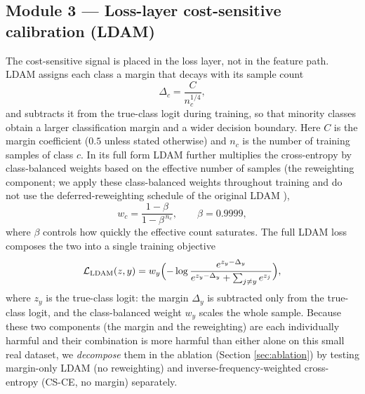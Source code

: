 \documentclass[a4paper,fleqn]{cas-sc}
\begin{document}
\begin{sloppypar}
	\subsection{Module 3 --- Loss-layer cost-sensitive calibration (LDAM)}
	\label{sec:ldam}
	\par{
		The cost-sensitive signal is placed in the loss layer, not in the feature path. LDAM \citep{cao2019learning} assigns each class a margin that decays with its sample count
		\begin{equation}
			\Delta_c=\frac{C}{n_c^{1/4}},
		\end{equation}
		and subtracts it from the true-class logit during training, so that minority classes obtain a larger classification margin and a wider decision boundary. Here $C$ is the margin coefficient ($0.5$ unless stated otherwise) and $n_c$ is the number of training samples of class $c$. In its full form LDAM further multiplies the cross-entropy by class-balanced weights based on the effective number of samples \citep{cui2019class} (the reweighting component; we apply these class-balanced weights throughout training and do not use the deferred-reweighting schedule of the original LDAM \citep{cao2019learning}),
		\begin{equation}
			w_c=\frac{1-\beta}{1-\beta^{\,n_c}},\qquad\beta=0.9999,
		\end{equation}
		where $\beta$ controls how quickly the effective count saturates. The full LDAM loss composes the two into a single training objective
		\begin{equation}
			\mathcal{L}_{\text{LDAM}}(z,y)=w_y\Bigl(-\log\frac{e^{z_y-\Delta_y}}{e^{z_y-\Delta_y}+\sum_{j\neq y}e^{z_j}}\Bigr),
			\label{eq:ldam}
		\end{equation}
		where $z_y$ is the true-class logit: the margin $\Delta_y$ is subtracted only from the true-class logit, and the class-balanced weight $w_y$ scales the whole sample. Because these two components (the margin and the reweighting) are each individually harmful and their combination is more harmful than either alone on this small real dataset, we \emph{decompose} them in the ablation (Section \ref{sec:ablation}) by testing margin-only LDAM (no reweighting) and inverse-frequency-weighted cross-entropy (CS-CE, no margin) separately.
	}


\end{sloppypar}
\end{document}
